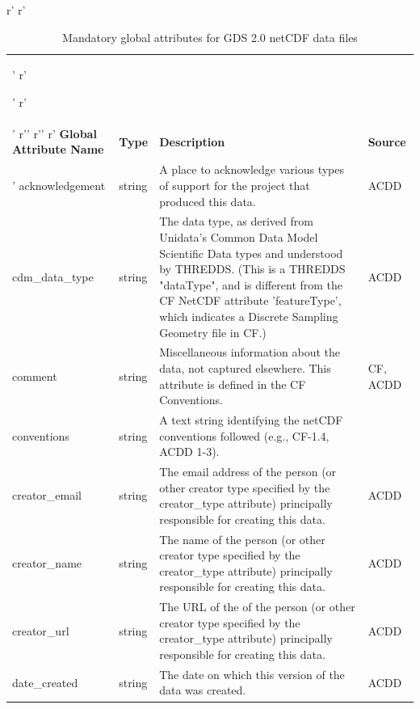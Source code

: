 r'%
r'\begin{longtable}{|p{}|p{}|p{}|p{}|}'
r'\caption{Mandatory global attributes for GDS 2.0 netCDF data files}'
r'\label{tab:global-attributes} \\ '
r'\hline \endhead'
r'\hline \endfoot'
r'\rowcolor{lightgray} \textbf{Global Attribute Name} & \textbf{Type} & \textbf{Description} & \textbf{Source} \\ \hline'
\rowcolor{LightCyan} acknowledgement & string & A place to acknowledge various types of support for the project that produced this data. & ACDD \\ \hline

\rowcolor{LightCyan} cdm\_data\_type & string & The data type, as derived from Unidata's Common Data Model Scientific Data types and understood by THREDDS. (This is a THREDDS "dataType", and is different from the CF NetCDF attribute 'featureType', which indicates a Discrete Sampling Geometry file in CF.) & ACDD \\ \hline

\rowcolor{LightCyan} comment & string & Miscellaneous information about the data, not captured elsewhere. This attribute is defined in the CF Conventions. & CF, ACDD \\ \hline

\rowcolor{LightCyan} conventions & string & A text string identifying the netCDF conventions followed (e.g., CF-1.4, ACDD 1-3). &  \\ \hline

\rowcolor{LightCyan} creator\_email & string & The email address of the person (or other creator type specified by the creator\_type attribute) principally responsible for creating this data. & ACDD \\ \hline

\rowcolor{LightCyan} creator\_name & string & The name of the person (or other creator type specified by the creator\_type attribute) principally responsible for creating this data. & ACDD \\ \hline

\rowcolor{LightCyan} creator\_url & string & The URL of the of the person (or other creator type specified by the creator\_type attribute) principally responsible for creating this data. & ACDD \\ \hline

\rowcolor{LightCyan} date\_created & string & The date on which this version of the data was created. & ACDD \\ \hline


\end{longtable}
